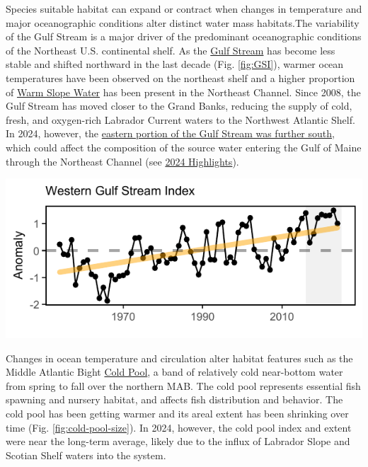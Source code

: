 \documentclass[
  10pt,
]{article}
\let\origfigure\figure
\let\endorigfigure\endfigure
\renewenvironment{figure}[1][2] {
    \expandafter\origfigure\expandafter[H]
} {
    \endorigfigure
}
\begin{document}
Species suitable habitat can expand or contract when changes in temperature and major oceanographic conditions alter distinct water mass habitats.The variability of the Gulf Stream is a major driver of the predominant oceanographic conditions of the Northeast U.S. continental shelf. As the \href{https://noaa-edab.github.io/catalog/gsi.html}{Gulf Stream} has become less stable and shifted northward in the last decade (Fig. \ref{fig:GSI}), warmer ocean temperatures have been observed on the northeast shelf and a higher proportion of \href{https://noaa-edab.github.io/catalog/slopewater.html}{Warm Slope Water} has been present in the Northeast Channel. Since 2008, the Gulf Stream has moved closer to the Grand Banks, reducing the supply of cold, fresh, and oxygen-rich Labrador Current waters to the Northwest Atlantic Shelf. In 2024, however, the \href{https://noaa-edab.github.io/catalog/gsi.html}{eastern portion of the Gulf Stream was further south}, which could affect the composition of the source water entering the Gulf of Maine through the Northeast Channel (see \hyperref[highlights]{2024 Highlights}).

\begin{figure}

{\centering \includegraphics{midatlantic_files/figure-latex/GSI-1} 

}

\caption{Index representing changes in the location of the western (between 64 and 55 degrees W) Gulf Stream north wall (black). Positive values represent a more northerly Gulf Stream position, with increasing trend (orange).}\label{fig:GSI}
\end{figure}

Changes in ocean temperature and circulation alter habitat features such as the Middle Atlantic Bight \href{https://noaa-edab.github.io/catalog/cold_pool.html}{Cold Pool}, a band of relatively cold near-bottom water from spring to fall over the northern MAB. The cold pool represents essential fish spawning and nursery habitat, and affects fish distribution and behavior. The cold pool has been getting warmer and its areal extent has been shrinking over time (Fig. \ref{fig:cold-pool-size}). In 2024, however, the cold pool index and extent were near the long-term average, likely due to the influx of Labrador Slope and Scotian Shelf waters into the system.
\end{document}
